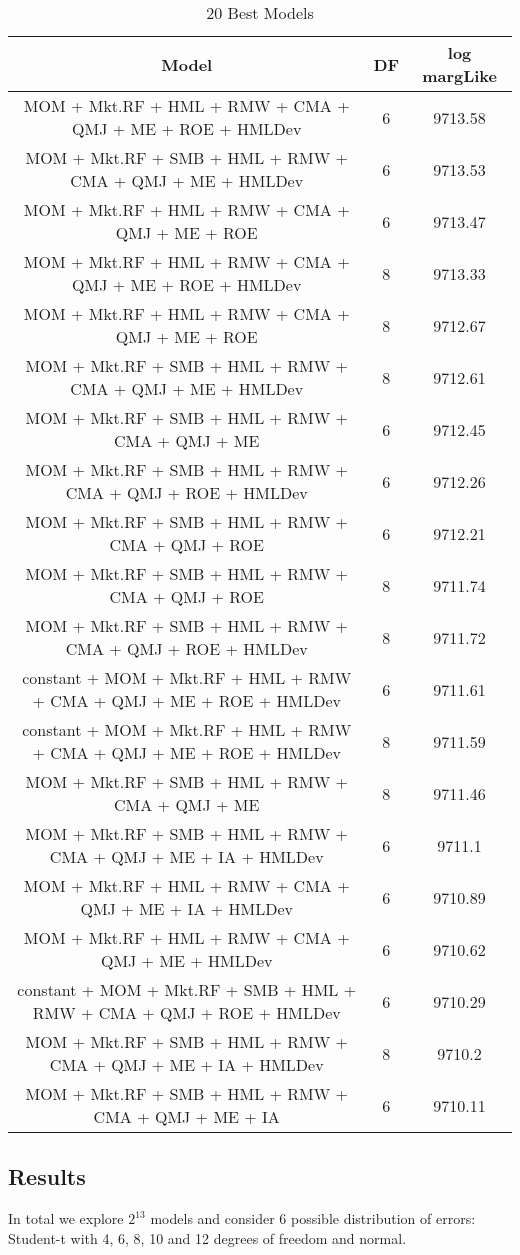 \begin{sidewaystable}[ht]
	\centering
	\begin{tabular}{ccc}
		\hline
		Model & DF & log margLike \\ 
		\hline
		MOM + Mkt.RF + HML + RMW + CMA + QMJ + ME + ROE + HMLDev & 6 & 9713.58 \\ 
		MOM + Mkt.RF + SMB + HML + RMW + CMA + QMJ + ME + HMLDev & 6 & 9713.53 \\ 
		MOM + Mkt.RF + HML + RMW + CMA + QMJ + ME + ROE & 6 & 9713.47 \\ 
		MOM + Mkt.RF + HML + RMW + CMA + QMJ + ME + ROE + HMLDev & 8 & 9713.33 \\ 
		MOM + Mkt.RF + HML + RMW + CMA + QMJ + ME + ROE & 8 & 9712.67 \\ 
		MOM + Mkt.RF + SMB + HML + RMW + CMA + QMJ + ME + HMLDev & 8 & 9712.61 \\ 
		MOM + Mkt.RF + SMB + HML + RMW + CMA + QMJ + ME & 6 & 9712.45 \\ 
		MOM + Mkt.RF + SMB + HML + RMW + CMA + QMJ + ROE + HMLDev & 6 & 9712.26 \\ 
		MOM + Mkt.RF + SMB + HML + RMW + CMA + QMJ + ROE & 6 & 9712.21 \\ 
		MOM + Mkt.RF + SMB + HML + RMW + CMA + QMJ + ROE & 8 & 9711.74 \\ 
		MOM + Mkt.RF + SMB + HML + RMW + CMA + QMJ + ROE + HMLDev & 8 & 9711.72 \\ 
		constant + MOM + Mkt.RF + HML + RMW + CMA + QMJ + ME + ROE + HMLDev & 6 & 9711.61 \\ 
		constant + MOM + Mkt.RF + HML + RMW + CMA + QMJ + ME + ROE + HMLDev & 8 & 9711.59 \\ 
		MOM + Mkt.RF + SMB + HML + RMW + CMA + QMJ + ME & 8 & 9711.46 \\ 
		MOM + Mkt.RF + SMB + HML + RMW + CMA + QMJ + ME + IA + HMLDev & 6 & 9711.1 \\ 
		MOM + Mkt.RF + HML + RMW + CMA + QMJ + ME + IA + HMLDev & 6 & 9710.89 \\ 
		MOM + Mkt.RF + HML + RMW + CMA + QMJ + ME + HMLDev & 6 & 9710.62 \\ 
		constant + MOM + Mkt.RF + SMB + HML + RMW + CMA + QMJ + ROE + HMLDev & 6 & 9710.29 \\ 
		MOM + Mkt.RF + SMB + HML + RMW + CMA + QMJ + ME + IA + HMLDev & 8 & 9710.2 \\ 
		MOM + Mkt.RF + SMB + HML + RMW + CMA + QMJ + ME + IA & 6 & 9710.11 \\ 
		\hline
	\end{tabular}
		\caption{20 Best Models}
\end{sidewaystable}
\subsection{Results}
In total we explore $2^{13}$ models and consider 6 possible distribution of errors: Student-t with 4, 6, 8, 10 and 12 degrees of freedom and normal. 

